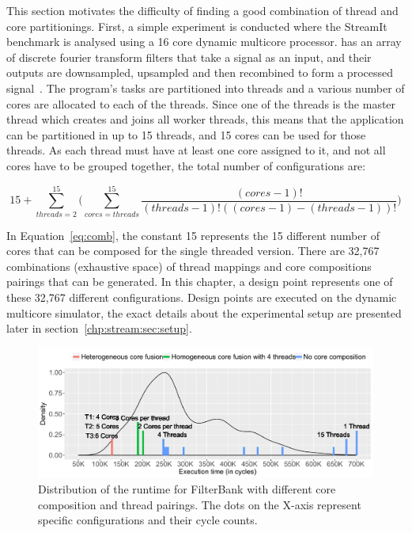 
This section motivates the difficulty of finding a good combination of thread and core partitionings.
First, a simple experiment is conducted where the  StreamIt benchmark is analysed using a 16 core dynamic multicore processor.
 has an array of discrete fourier transform filters that take a signal as an input, and their outputs are downsampled, upsampled and then recombined to form a processed signal~\cite{streamitrepo}.
The program's tasks are partitioned into threads and a various number of cores are allocated to each of the threads.
Since one of the threads is the master thread which creates and joins all worker threads, this means that the application can be partitioned in up to 15 threads, and 15 cores can be used for those threads.
As each thread must have at least one core assigned to it, and not all cores have to be grouped together, the total number of configurations are:

\begin{equation}
15 + \sum_{threads=2}^{15} \bigg( \sum_{cores=threads}^{15} \frac{(cores-1)!}{(threads-1)!((cores-1)-(threads-1))!}\bigg)
\label{eq:comb}
\end{equation}

In Equation~\ref{eq:comb}, the constant 15 represents the 15 different number of cores that can be composed for the single threaded version.
There are 32,767 combinations (exhaustive space) of thread mappings and core compositions pairings that can be generated.
In this chapter, a design point represents one of these 32,767 different configurations.
Design points are executed on the dynamic multicore simulator, the exact details about the experimental setup are presented later in section~\ref{chp:stream:sec:setup}.

\begin{figure}[t]
    \centering
    \includegraphics[width=1\textwidth]{streamit-paper/graphics/filterbank_motivation_2.pdf}
    \caption{Distribution of the runtime for FilterBank with different core composition and thread pairings. The dots on the X-axis represent specific configurations and their cycle counts.}
     \label{fig:threadcoremotiv}
\end{figure}

